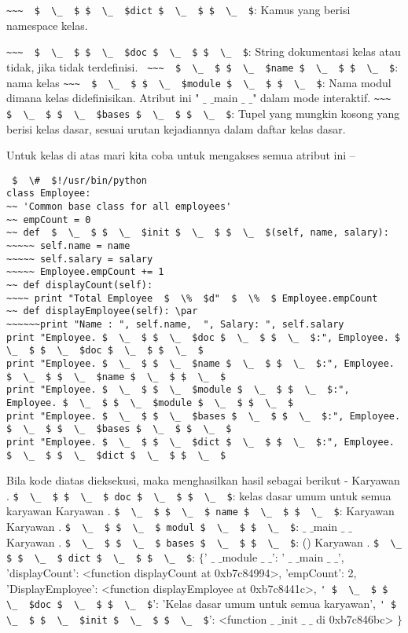 \verb|~~~  $  \_  $ $  \_  $dict $  \_  $ $  \_  $|: Kamus yang berisi namespace kelas.

\verb|~~~  $  \_  $ $  \_  $doc $  \_  $ $  \_  $|: String dokumentasi kelas atau tidak, jika tidak terdefinisi.
\verb| ~~~  $  \_  $ $  \_  $name $  \_  $ $  \_  $|: nama kelas
\verb|~~~  $  \_  $ $  \_  $module $  \_  $ $  \_  $|: Nama modul dimana kelas didefinisikan. Atribut ini " $  \_  $ $  \_  $main $  \_  $ $  \_  $" dalam mode interaktif.
\verb|~~~  $  \_  $ $  \_  $bases $  \_  $ $  \_  $|: Tupel yang mungkin kosong yang berisi kelas dasar, sesuai urutan kejadiannya dalam daftar kelas dasar.

Untuk kelas di atas mari kita coba untuk mengakses semua atribut ini –
\begin{verbatim}
 $  \#  $!/usr/bin/python
class Employee:
~~ 'Common base class for all employees'
~~ empCount = 0
~~ def  $  \_  $ $  \_  $init $  \_  $ $  \_  $(self, name, salary):
~~~~~ self.name = name
~~~~~ self.salary = salary
~~~~~ Employee.empCount += 1
~~ def displayCount(self):
~~~~ print "Total Employee  $  \%  $d"  $  \%  $ Employee.empCount
~~ def displayEmployee(self): \par
~~~~~~print "Name : ", self.name,  ", Salary: ", self.salary
print "Employee. $  \_  $ $  \_  $doc $  \_  $ $  \_  $:", Employee. $  \_  $ $  \_  $doc $  \_  $ $  \_  $
print "Employee. $  \_  $ $  \_  $name $  \_  $ $  \_  $:", Employee. $  \_  $ $  \_  $name $  \_  $ $  \_  $
print "Employee. $  \_  $ $  \_  $module $  \_  $ $  \_  $:", Employee. $  \_  $ $  \_  $module $  \_  $ $  \_  $
print "Employee. $  \_  $ $  \_  $bases $  \_  $ $  \_  $:", Employee. $  \_  $ $  \_  $bases $  \_  $ $  \_  $
print "Employee. $  \_  $ $  \_  $dict $  \_  $ $  \_  $:", Employee. $  \_  $ $  \_  $dict $  \_  $ $  \_  $
\end{verbatim}

Bila kode diatas dieksekusi, maka menghasilkan hasil sebagai berikut -
Karyawan . \verb|$  \_  $ $  \_  $ doc $  \_  $ $  \_  $|: kelas dasar umum untuk semua karyawan
Karyawan . \verb|$  \_  $ $  \_  $ name $  \_  $ $  \_  $|: Karyawan
Karyawan . \verb|$  \_  $ $  \_  $ modul $  \_  $ $  \_  $|:  $  \_  $ $  \_  $main $  \_  $ $  \_  $
Karyawan . \verb|$  \_  $ $  \_  $ bases $  \_  $ $  \_  $|: ()
Karyawan . \verb|$  \_  $ $  \_  $ dict $  \_  $ $  \_  $|:  $  \{  $' $  \_  $ $  \_  $module $  \_  $ $  \_  $': ' $  \_  $ $  \_  $main $  \_  $ $  \_  $', 'displayCount':
<function displayCount at 0xb7c84994>, 'empCount': 2,
'DisplayEmployee': <function displayEmployee at 0xb7c8441c>,
\verb|' $  \_  $ $  \_  $doc $  \_  $ $  \_  $|': 'Kelas dasar umum untuk semua karyawan',
\verb|' $  \_  $ $  \_  $init $  \_  $ $  \_  $|': <function  $  \_  $ $  \_  $init $  \_  $ $  \_  $ di 0xb7c846bc> $  \}  $ \par

